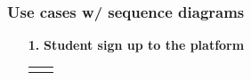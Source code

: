 \documentclass{article}
\begin{document}
{\begin{itemize}
\end{itemize}
\subsubsection{Use cases w/ sequence diagrams}
\begin{enumerate}
    \item[\textbf{1.}] \textbf{Student sign up to the platform}

          \begin{xltabular}{\textwidth}
              {| >{\raggedright\arraybackslash}g | >{\raggedright\arraybackslash}X |}
              \hline
              \endfirsthead
              \hline
              \endhead
              \endfoot
              \hline
              \endlastfoot





\end{xltabular}
\end{enumerate}}
\end{document}
